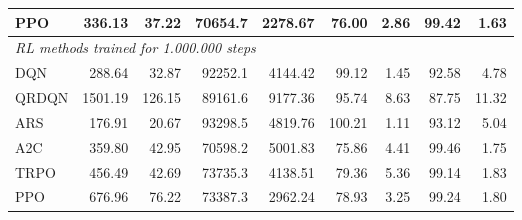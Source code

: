 \begin{samepage}
\begin{center}
\begin{tabular}{l|rr|rr|rr|rr}
    PPO          &   336.13 &    37.22 &    70654.7 &    2278.67 &   76.00 &    2.86 &   99.42 &    1.63 \\
    \midrule
    \multicolumn{9}{l}{\textit{RL methods trained for 1.000.000 steps}} \\
    \midrule
    DQN          &   288.64 &    32.87 &    92252.1 &    4144.42 &   99.12 &    1.45 &   92.58 &    4.78 \\
    QRDQN        &  1501.19 &   126.15 &    89161.6 &    9177.36 &   95.74 &    8.63 &   87.75 &   11.32 \\
    ARS          &   176.91 &    20.67 &    93298.5 &    4819.76 &  100.21 &    1.11 &   93.12 &    5.04 \\
    A2C          &   359.80 &    42.95 &    70598.2 &    5001.83 &   75.86 &    4.41 &   99.46 &    1.75 \\
    TRPO         &   456.49 &    42.69 &    73735.3 &    4138.51 &   79.36 &    5.36 &   99.14 &    1.83 \\
    PPO          &   676.96 &    76.22 &    73387.3 &    2962.24 &   78.93 &    3.25 &   99.24 &    1.80 \\
    \bottomrule
  \end{tabular}
\end{center}
\end{samepage}

